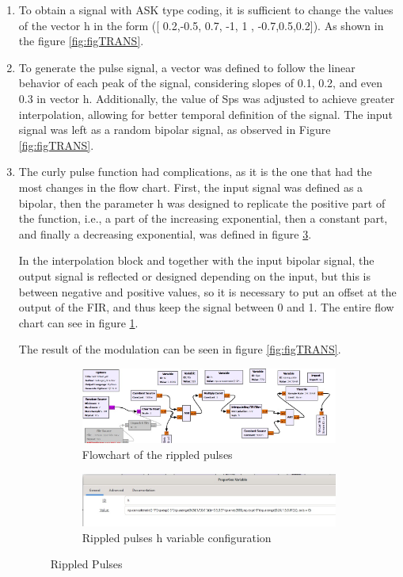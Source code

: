 \documentclass{journal}[IEEEtran, twocolumn]             %
\begin{document}
\begin{multicols}{2}
\begin{enumerate}
    \item To obtain a signal with ASK type coding, it is sufficient to change the values of the vector h in the form ([ 0.2,-0.5, 0.7, -1, 1 , -0.7,0.5,0.2]). As shown in the figure \ref{fig:figTRANS}.

    \item To generate the pulse signal, a vector was defined to follow the linear behavior of each peak of the signal, considering slopes of 0.1, 0.2, and even 0.3 in vector h. Additionally, the value of Sps was adjusted to achieve greater interpolation, allowing for better temporal definition of the signal. The input signal was left as a random bipolar signal, as observed in Figure \ref{fig:figTRANS}.

    \item The curly pulse function had complications, as it is the one that had the most changes in the flow chart. First, the input signal was defined as a bipolar, then the parameter h was designed to replicate the positive part of the function, i.e., a part of the increasing exponential, then a constant part, and finally a decreasing exponential, was defined in figure \ref{fig:W_h}. 

    In the interpolation block and together with the input bipolar signal, the output signal is reflected or designed depending on the input, but this is between negative and positive values, so it is necessary to put an offset at the output of the FIR, and thus keep the signal between 0 and 1. The entire flow chart can see in figure \ref{fig:W_flujograma}. 

    The result of the modulation can be seen in figure \ref{fig:figTRANS}.
    \begin{figure}[H]
    \centering

        \begin{subfigure}{0.9\columnwidth}
        \includegraphics[width=0.7\columnwidth]{figs/pt_W_flujograma.jpeg}
        \caption{Flowchart of the rippled pulses}
        \label{fig:W_flujograma}
    \end{subfigure}
    
    \begin{subfigure}{0.9\columnwidth}
        \includegraphics[width=0.9\columnwidth]{figs/pt_W_h.jpeg}
        \caption{Rippled pulses h variable configuration}
        \label{fig:W_h}
    \end{subfigure}
    \caption{Rippled Pulses}
    \end{figure}


\end{enumerate}
\end{multicols}
\end{document}
